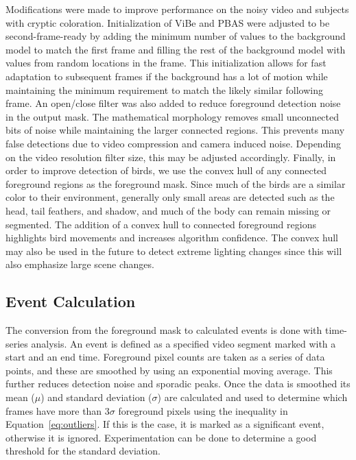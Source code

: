 Modifications were made to improve performance on the noisy video and subjects with cryptic coloration. Initialization of ViBe and PBAS were adjusted to be second-frame-ready by adding the minimum number of values to the background model to match the first frame and filling the rest of the background model with values from random locations in the frame. This initialization allows for fast adaptation to subsequent frames if the background has a lot of motion while maintaining the minimum requirement to match the likely similar following frame. An open/close filter was also added to reduce foreground detection noise in the output mask. The mathematical morphology removes small unconnected bits of noise while maintaining the larger connected regions. This prevents many false detections due to video compression and camera induced noise. Depending on the video resolution filter size, this may be adjusted accordingly. Finally, in order to improve detection of birds, we use the convex hull of any connected foreground regions as the foreground mask. Since much of the birds are a similar color to their environment, generally only small areas are detected such as the head, tail feathers, and shadow, and much of the body can remain missing or segmented. The addition of a convex hull to connected foreground regions highlights bird movements and increases algorithm confidence. The convex hull may also be used in the future to detect extreme lighting changes since this will also emphasize large scene changes.


\subsection{Event Calculation}
\label{sec:event_calc}

The conversion from the foreground mask to calculated events is done with time-series analysis. An event is defined as a specified video segment marked with a start and an end time. Foreground pixel counts are taken as a series of data points, and these are smoothed by using an exponential moving average. This further reduces detection noise and sporadic peaks. Once the data is smoothed its mean ($\mu$) and standard deviation ($\sigma$) are calculated and used to determine which frames have more than $3\sigma$ foreground pixels using the inequality in Equation~\ref{eq:outliers}. If this is the case, it is marked as a significant event, otherwise it is ignored. Experimentation can be done to determine a good threshold for the standard deviation.

